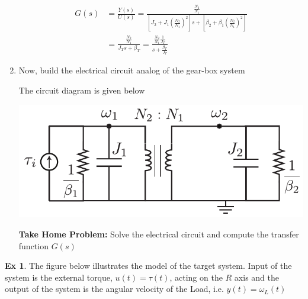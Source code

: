 \documentclass[twoside]{article}
\theoremstyle{definition}
\newtheorem{exmp}[theorem]{Ex}
\begin{document}
\begin{enumerate}
\begin{align*}
	G(s) &= \frac{Y(s)}{U(s)} = 
	\frac{ \frac{N_2}{N_1}  }{ \left[ J_2 + J_1  \left(\frac{N_2}{N_1}\right)^2  \right] s +  \left[ \beta_2 + \beta_1 \left(\frac{N_2}{N_1}\right)^2 \right]}
	\\
	&= 
	\frac{ \frac{N_2}{N_1}  }{ J_T s + \beta_T } = \frac{ \frac{N_2}{N_1} \frac{1}{J_T}  }{ s + \frac{\beta_T}{J_T} } 
\end{align*}
  
  \item Now, build the electrical circuit analog of the gear-box system
  
  \par
  
  The circuit diagram is given below
  
    \begin{minipage}[h]{0.75\linewidth}
    \begin{center}
      \includegraphics[width=1\textwidth]{ex2_elec}
    \end{center}
  \end{minipage}

\textbf{Take Home Problem:} Solve the electrical circuit and compute the transfer function $G(s)$   
  
\end{enumerate}

\vspace{12pt}

\begin{exmp} The figure below illustrates the model of the target system. Input of the system is the external torque, $u(t) = \tau(t)$, acting on the $R$ axis
and the output of the system is the angular velocity of the Load, i.e. $y(t) = \omega_L (t)$
\end{exmp}

\vspace{12pt}
\end{document}
